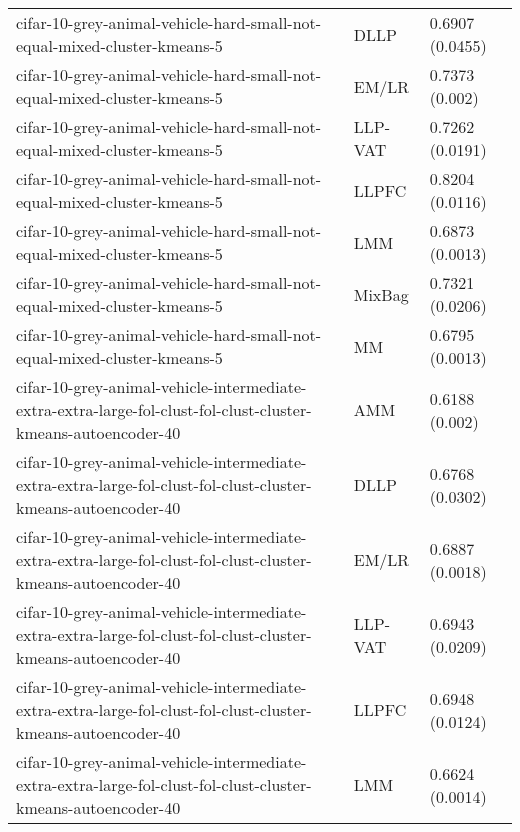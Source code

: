 \begin{longtable}{lll}
                                     cifar-10-grey-animal-vehicle-hard-small-not-equal-mixed-cluster-kmeans-5 &      DLLP &                           0.6907 (0.0455) \\
                                     cifar-10-grey-animal-vehicle-hard-small-not-equal-mixed-cluster-kmeans-5 &     EM/LR &                            0.7373 (0.002) \\
                                     cifar-10-grey-animal-vehicle-hard-small-not-equal-mixed-cluster-kmeans-5 &   LLP-VAT &                           0.7262 (0.0191) \\
                                     cifar-10-grey-animal-vehicle-hard-small-not-equal-mixed-cluster-kmeans-5 &     LLPFC &                           0.8204 (0.0116) \\
                                     cifar-10-grey-animal-vehicle-hard-small-not-equal-mixed-cluster-kmeans-5 &       LMM &                           0.6873 (0.0013) \\
                                     cifar-10-grey-animal-vehicle-hard-small-not-equal-mixed-cluster-kmeans-5 &    MixBag &                           0.7321 (0.0206) \\
                                     cifar-10-grey-animal-vehicle-hard-small-not-equal-mixed-cluster-kmeans-5 &        MM &                           0.6795 (0.0013) \\
cifar-10-grey-animal-vehicle-intermediate-extra-extra-large-fol-clust-fol-clust-cluster-kmeans-autoencoder-40 &       AMM &                            0.6188 (0.002) \\
cifar-10-grey-animal-vehicle-intermediate-extra-extra-large-fol-clust-fol-clust-cluster-kmeans-autoencoder-40 &      DLLP &                           0.6768 (0.0302) \\
cifar-10-grey-animal-vehicle-intermediate-extra-extra-large-fol-clust-fol-clust-cluster-kmeans-autoencoder-40 &     EM/LR &                           0.6887 (0.0018) \\
cifar-10-grey-animal-vehicle-intermediate-extra-extra-large-fol-clust-fol-clust-cluster-kmeans-autoencoder-40 &   LLP-VAT &                           0.6943 (0.0209) \\
cifar-10-grey-animal-vehicle-intermediate-extra-extra-large-fol-clust-fol-clust-cluster-kmeans-autoencoder-40 &     LLPFC &                           0.6948 (0.0124) \\
cifar-10-grey-animal-vehicle-intermediate-extra-extra-large-fol-clust-fol-clust-cluster-kmeans-autoencoder-40 &       LMM &                           0.6624 (0.0014) \\

\end{longtable}
